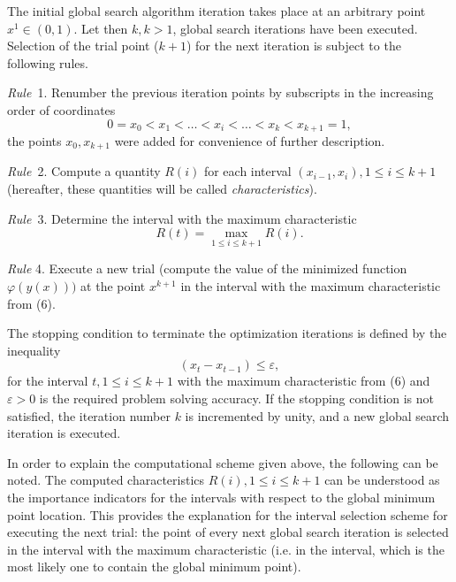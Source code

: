 \documentclass[
11pt,%
tightenlines,%
twoside,%
onecolumn,%
nofloats,%
nobibnotes,%
nofootinbib,%
superscriptaddress,%
noshowpacs,%
centertags]%
{revtex4}
\begin{document}
The initial global search algorithm iteration takes place at an arbitrary point $x^1 \in (0,1)$. Let then $k, k > 1$, global search iterations have been executed. Selection of the trial point ($k + 1$) for the next iteration is subject to the following rules.

\textit{Rule}~1. Renumber the previous iteration points by subscripts in the increasing order of coordinates
\begin{equation}
0 = x_0 < x_1 < \dots < x_i < \dots < x_k < x_{k+1} = 1,
\end{equation}
the points $x_0, x_{k+1}$ were added for convenience of further description.

\textit{Rule}~2. Compute a quantity $R(i)$ for each interval $(x_{i-1}, x_i), 1 \leq i \leq k + 1$ (hereafter, these quantities will be called \textit{characteristics}).

\textit{Rule}~3. Determine the interval with the maximum characteristic
\begin{equation}
R(t) = \max_{1 \leq i \leq k + 1}R(i).
\end{equation}

\textit{Rule} 4. Execute a new trial (compute the value of the minimized function $\varphi(y(x)))$ at the point $x^{k+1}$ in the interval with the maximum characteristic from (6).

The stopping condition to terminate the optimization iterations is defined by the inequality
\begin{equation}
(x_t - x_{t-1}) \leq \varepsilon,
\end{equation}
for the interval $t, 1 \leq i \leq k + 1$ with the maximum characteristic from (6) and $\varepsilon > 0$ is the required problem solving accuracy. If the stopping condition is not satisfied, the iteration number $k$ is incremented by unity, and a new global search iteration is executed.

In order to explain the computational scheme given above, the following can be noted. The computed characteristics $R(i), 1 \leq i \leq k + 1$ can be understood as the importance indicators for the intervals with respect to the global minimum point location. This provides the explanation for the interval selection scheme for executing the next trial: the point of every next global search iteration is selected in the interval with the maximum characteristic (i.e. in the interval, which is the most likely one to contain the global minimum point).
\end{document}
